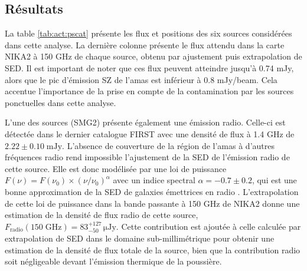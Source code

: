 \subsection{Résultats}

La table \ref{tab:act:pscat} présente les flux et positions des six sources considérées dans cette analyse.
La dernière colonne présente le flux attendu dans la carte NIKA2 à 150 GHz de chaque source, obtenu par ajustement puis extrapolation de SED.
Il est important de noter que ces flux peuvent atteindre jusqu'à 0.74 mJy, alors que le pic d'émission SZ de l'amas est inférieur à 0.8 mJy/beam.
Cela accentue l'importance de la prise en compte de la contamination par les sources ponctuelles dans cette analyse.

L'une des sources (SMG2) présente également une émission radio.
Celle-ci est détectée dans le dernier catalogue FIRST \cite{helfand_last_2015} avec une densité de flux à 1.4 GHz de $2.22 \pm 0.10 \; \mathrm{mJy}$.
L'absence de couverture de la région de l'amas à d'autres fréquences radio rend impossible l'ajustement de la SED de l'émission radio de cette source.
Elle est donc modélisée par une loi de puissance $F(\nu) = F(\nu_0)\times(\nu/\nu_0)^\alpha$ avec un indice spectral $\alpha=-0.7 \pm 0.2$, qui est une bonne approximation de la SED de galaxies émettrices en radio \cite{condon_cosmological_1984}.
L'extrapolation de cette loi de puissance dans la bande passante à 150 GHz de NIKA2 donne une estimation de la densité de flux radio de cette source, $F_\mathrm{radio}(\mathrm{150\; GHz}) = 83 ^{+127}_{-50} \,\mathrm{\mu Jy}$.
Cette contribution est ajoutée à celle calculée par extrapolation de SED dans le domaine sub-millimétrique pour obtenir une estimation de la densité de flux totale de la source, bien que la contribution radio soit négligeable devant l'émission thermique de la poussière.

